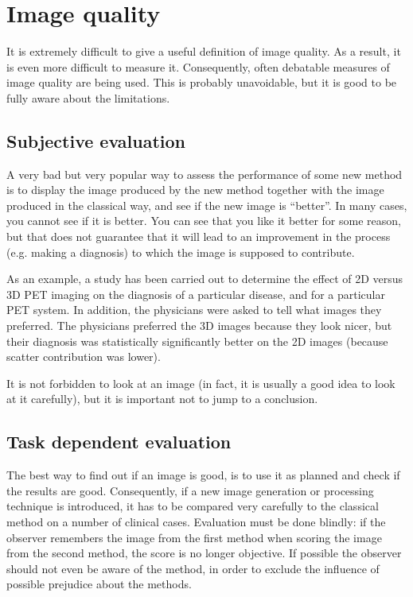 \section{Image quality}
It is extremely difficult to give a useful definition of image quality. As a
result, it is even more difficult to measure it. Consequently, often debatable
measures of image quality are being used. This is probably unavoidable, but it
is good to be fully aware about the limitations.

\subsection{Subjective evaluation}
A very bad but very popular way to assess the performance of some new method
is to display the image produced by the new method together with the image
produced in the classical way, and see if the new image is ``better''. In many
cases, you cannot see if it is better. You can see that you like it better for
some reason, but that does not guarantee that it will lead to an improvement
in the process (e.g. making a diagnosis) to which the image is supposed to
contribute.

As an example, a study has been carried out to determine the effect of
2D versus 3D PET imaging on the diagnosis of a particular disease, and
for a particular PET system. In addition, the physicians were asked to
tell what images they preferred. The physicians preferred the 3D
images because they look nicer, but their diagnosis was statistically
significantly better on the 2D images (because scatter contribution
was lower).

It is not forbidden to look at an image (in fact, it is usually a good
idea to look at it carefully), but it is important not to jump to a
conclusion.

\subsection{Task dependent evaluation}
The best way to find out if an image is good, is to use it as planned and
check if the results are good. Consequently, if a new image generation or
processing technique is introduced, it has to be compared very carefully to
the classical method on a number of clinical cases. Evaluation must be done
blindly: if the observer remembers the image from the first method when
scoring the image from the second method, the score is no longer objective. If
possible the observer should not even be aware of the method, in order to
exclude the influence of possible prejudice about the methods.

